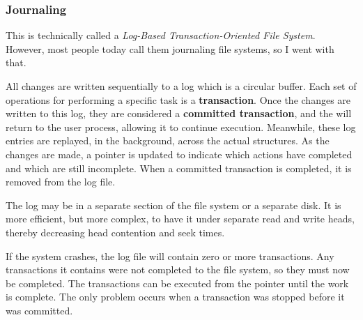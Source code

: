 \subsubsection{Journaling}\label{subsubsec:Journaling}
This is technically called a \emph{Log-Based Transaction-Oriented File System}.
However, most people today call them journaling file systems, so I went with that.

All  changes are written sequentially to a log which is a circular buffer.
Each set of operations for performing a specific task is a \textbf{transaction}.
Once the changes are written to this log, they are considered a \textbf{committed transaction}, and the  will return to the user process, allowing it to continue execution.
Meanwhile, these log entries are replayed, in the background, across the actual  structures.
As the changes are made, a pointer is updated to indicate which actions have completed and which are still incomplete.
When a committed transaction is completed, it is removed from the log file.

The log may be in a separate section of the file system or a separate disk.
It is more efficient, but more complex, to have it under separate read and write heads, thereby decreasing head contention and seek times.

If the system crashes, the log file will contain zero or more transactions.
Any transactions it contains were not completed to the file system, so they must now be completed.
The transactions can be executed from the pointer until the work is complete.
The only problem occurs when a transaction was stopped before it was committed.



